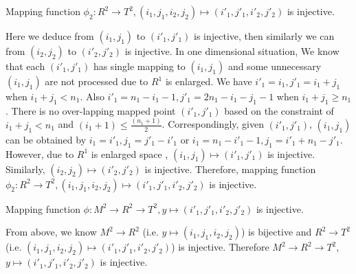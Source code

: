 \documentclass[AMA,LATO1COL]{WileyNJD-v2}
\begin{document}
\begin{lemma}
Mapping function $\phi_2:   R^2 \rightarrow  T^2, (i_1,j_1,i_2,j_2) \mapsto (i'_1,j'_1,i'_2,j'_2)$ is injective.
\end{lemma}
Here we deduce from $(i_1,j_1)$ to $(i'_1,j'_1)$ is injective, then similarly we can  from $(i_2,j_2)$ to $(i'_2,j'_2)$ is injective. In one dimensional situation, We know that each $(i'_1,j'_1)$ has single mapping to $(i_1,j_1)$ and some unnecessary $(i_1,j_1)$ are not processed due to $R^1$ is enlarged. We have $i'_1=i_1, j'_1=i_1+j_1$ when $i_1+j_1<n_1$. Also $i'_1=n_1-i_1-1, j'_1=2n_1-i_1-j_1-1$ when $i_1+j_1\geq n_1$. There is no over-lapping mapped point $(i'_1,j'_1)$ based on the constraint of $i_1+j_1<n_1$ and  $(i_1+1) \leq \frac{(n_1+1)}{2}$. Correspondingly, given $(i'_1,j'_1)$, $(i_1,j_1)$ can be obtained by $i_1=i'_1, j_1=j'_1-i'_1$ or $i_1=n_1-i'_1-1, j_1=i'_1+n_1-j'_1$. However, due to $R^1$ is enlarged space , $(i_1,j_1) \mapsto (i'_1,j'_1)$ is injective. Similarly, $(i_2,j_2) \mapsto (i'_2,j'_2)$ is injective. Therefore, mapping function $\phi_2:   R^2 \rightarrow  T^2, (i_1,j_1,i_2,j_2) \mapsto (i'_1,j'_1,i'_2,j'_2)$ is injective.

\begin{corollary}
Mapping function $\phi:   M^2 \rightarrow R^2 \rightarrow  T^2,y \mapsto (i'_1,j'_1,i'_2,j'_2)$ is injective.
\end{corollary}
From above, we know $M^2  \rightarrow R^2$ (i.e. $y \mapsto (i_1,j_1,i_2,j_2)$) is bijective and $R^2 \rightarrow  T^2$ (i.e. $(i_1,j_1,i_2,j_2) \mapsto (i'_1,j'_1,i'_2,j'_2)$) is injective. Therefore $ M^2  \rightarrow R^2 \rightarrow  T^2$,  $y \mapsto (i'_1,j'_1,i'_2,j'_2)$ is injective.
\end{document}
